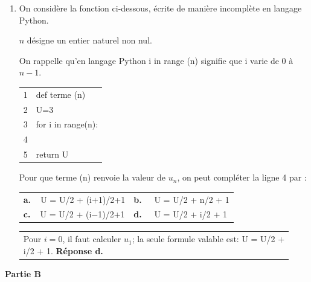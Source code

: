 \begin{enumerate}
\medskip

\item On considère la fonction ci-dessous, écrite de manière incomplète en langage Python.

\begin{minipage}{0.58\linewidth}
$n$ désigne un entier naturel non nul. 

On rappelle qu'en langage Python
\og i in range (n)\fg{} signifie que i varie de 0 à $n-1$.
\end{minipage}\hfill
\begin{minipage}{0.38\linewidth}
\begin{tabular}{|c|l|}\hline
1&def terme (n)\\
2&\qquad U=3\\
3&\qquad for i in range(n): \\
4& \dotfill \\
5&\qquad return U\\ \hline
\end{tabular}
\end{minipage}

Pour que terme (n) renvoie la valeur de $u_n$, on peut compléter la ligne 4 par : 

\begin{center}
\begin{tabularx}{\linewidth}{*{2}{X}}
\textbf{a.~~}U = U/2 + (i$+$1)/2+1	&\textbf{b.~~} U = U/2 + n/2 + 1\\
\textbf{c.~~}U = U/2 + (i$-$1)/2+1 	&\textbf{d.~~} U = U/2 + i/2 + 1
\end{tabularx}
\end{center}

\begin{tabular}{@{\hspace*{0.05\linewidth}} || p{0.93\linewidth}}
Pour $i=0$, il faut calculer $u_1$; la seule formule valable est: U = U/2 + i/2 + 1.
\hfill\textbf{Réponse d.}
\end{tabular}

\end{enumerate}

\bigskip

\textbf{Partie B}

\medskip

